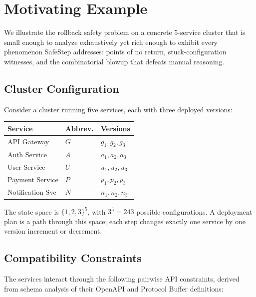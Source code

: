 \documentclass[10pt,twocolumn]{article}
\begin{document}
\section{Motivating Example}
\label{sec:motivation}

We illustrate the rollback safety problem on a concrete 5-service cluster
that is small enough to analyze exhaustively yet rich enough to exhibit
every phenomenon SafeStep addresses: points of no return,
stuck-configuration witnesses, and the combinatorial blowup that defeats
manual reasoning.

\subsection{Cluster Configuration}
\label{sec:motivation:cluster}

Consider a cluster running five services, each with three deployed
versions:

\begin{center}
\begin{tabular}{lll}
\toprule
\textbf{Service} & \textbf{Abbrev.} & \textbf{Versions} \\
\midrule
API Gateway      & $G$ & $g_1, g_2, g_3$ \\
Auth Service     & $A$ & $a_1, a_2, a_3$ \\
User Service     & $U$ & $u_1, u_2, u_3$ \\
Payment Service  & $P$ & $p_1, p_2, p_3$ \\
Notification Svc & $N$ & $n_1, n_2, n_3$ \\
\bottomrule
\end{tabular}
\end{center}

\noindent
The state space is $\{1,2,3\}^5$, with $3^5 = 243$ possible
configurations.  A deployment plan is a path through this space; each step
changes exactly one service by one version increment or decrement.

\subsection{Compatibility Constraints}
\label{sec:motivation:constraints}

The services interact through the following pairwise API constraints,
derived from schema analysis of their OpenAPI and Protocol Buffer
definitions:
\end{document}
